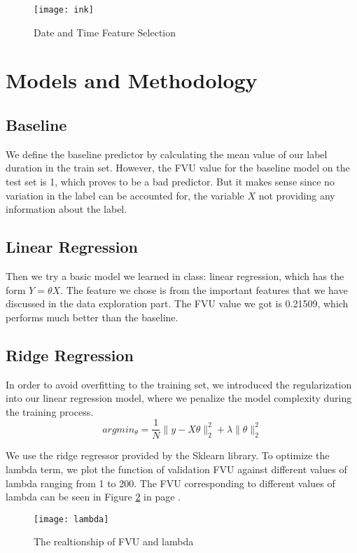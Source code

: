   \begin{figure}[h!]
  \centering
  \texttt{[image: ink]}
  \caption{Date and Time Feature Selection}
  \label{fig_date}
  \end{figure}


\section{Models and Methodology}

\subsection{Baseline}
We define the baseline predictor by calculating the mean value of our label duration in the train set. However, the FVU value for the baseline model on the test set is 1, which proves to be a bad predictor. But it makes sense since no variation in the label can be accounted for, the variable $X$ not providing any information about the label.

\subsection{Linear Regression}
Then we try a basic model we learned in class: linear regression, which has the form $Y = \theta  X$.  The feature we chose is from the important features that we have discussed in the data exploration part. The FVU value we got is 0.21509, which performs much better than the baseline.

\subsection{Ridge Regression}
In order to avoid overfitting to the training set, we introduced the regularization into our linear regression model, where we penalize the model complexity during the training process.
\[argmin_{\theta}= \frac{1}{N}\|y-X\theta\|_{2}^{2}+\lambda\|\theta\|_{2}^{2}\]
\par We use the ridge regressor provided by the Sklearn library. To optimize the lambda term, we plot the function of validation FVU against different values of lambda ranging from 1 to 200. The FVU corresponding to different values of lambda can be{} seen in Figure \ref{fig_lam} in page \pageref{fig_lam}.

  \begin{figure}[h!]
  \centering
  \texttt{[image: lambda]}
  \caption{The realtionship of FVU and lambda}
  \label{fig_lam}
  \end{figure}

